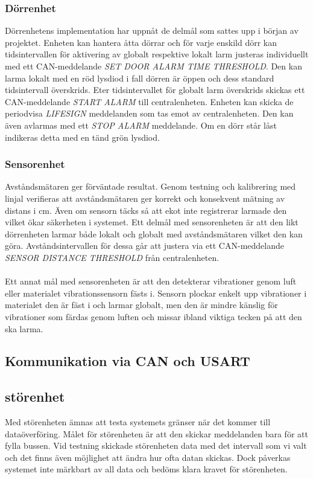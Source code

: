 \documentclass{article}
\begin{document}
\subsubsection{Dörrenhet}
Dörrenhetens implementation har uppnåt de delmål som sattes upp i början av projektet. 
Enheten kan hantera åtta dörrar och för varje enskild dörr kan tidsintervallen för aktivering av globalt respektive lokalt larm justeras individuellt med ett CAN-meddelande \emph{SET DOOR ALARM TIME THRESHOLD}. 
Den kan larma lokalt med en röd lysdiod i fall dörren är öppen och dess standard tidsintervall överskrids.
Eter tidsintervallet för globalt larm överskrids skickas ett CAN-meddelande \emph{START ALARM} till centralenheten.
Enheten kan skicka de periodvisa \emph{LIFESIGN} meddelanden som tas emot av centralenheten.
Den kan även avlarmas med ett \emph{STOP ALARM} meddelande. 
Om en dörr står låst indikeras detta med en tänd grön lysdiod.

\subsubsection{Sensorenhet}
Avståndsmätaren ger förväntade resultat.
Genom testning och kalibrering med linjal verifieras att avståndsmätaren ger korrekt och konsekvent mätning av distans i cm.
Även om sensorn täcks så att ekot inte registrerar larmade den vilket ökar säkerheten i systemet. 
Ett delmål med sensorenheten är att den likt dörrenheten larmar både lokalt och globalt med avståndsmätaren vilket den kan göra. 
Avståndsintervallen för dessa går att justera via ett CAN-meddelande \emph{SENSOR DISTANCE THRESHOLD} från centralenheten.\\
\\
Ett annat mål med sensorenheten är att den detekterar vibrationer genom luft eller materialet vibrationssensorn fästs i. Sensorn plockar enkelt upp vibrationer i materialet den är fäst i och larmar globalt, men den är mindre känslig för vibrationer som färdas genom luften och missar ibland viktiga tecken på att den ska larma.

\subsection{Kommunikation via CAN och USART}

\subsection{störenhet}
Med störenheten ämnas att testa systemets gränser när det kommer till dataöverföring. 
Målet för störenheten är att den skickar meddelanden bara för att fylla bussen. 
Vid testning skickade störenheten data med det intervall som vi valt och det finns även möjlighet att ändra hur ofta datan skickas.
Dock påverkas systemet inte märkbart av all data och bedöms klara kravet för störenheten.
\end{document}
